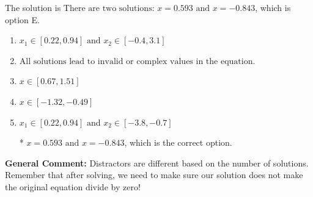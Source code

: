 \documentclass{extbook}[14pt]
\begin{document}
\begin{enumerate}
{The solution is \( \text{There are two solutions: } x = 0.593 \text{ and } x = -0.843 \), which is option E.\begin{enumerate}[label=\Alph*.]
\item \( x_1 \in [0.22, 0.94] \text{ and } x_2 \in [-0.4,3.1] \)


\item \( \text{All solutions lead to invalid or complex values in the equation.} \)


\item \( x \in [0.67,1.51] \)


\item \( x \in [-1.32,-0.49] \)


\item \( x_1 \in [0.22, 0.94] \text{ and } x_2 \in [-3.8,-0.7] \)

* $x = 0.593 \text{ and } x = -0.843$, which is the correct option.
\end{enumerate}

\textbf{General Comment:} Distractors are different based on the number of solutions. Remember that after solving, we need to make sure our solution does not make the original equation divide by zero!
}
\end{enumerate}
\end{document}
